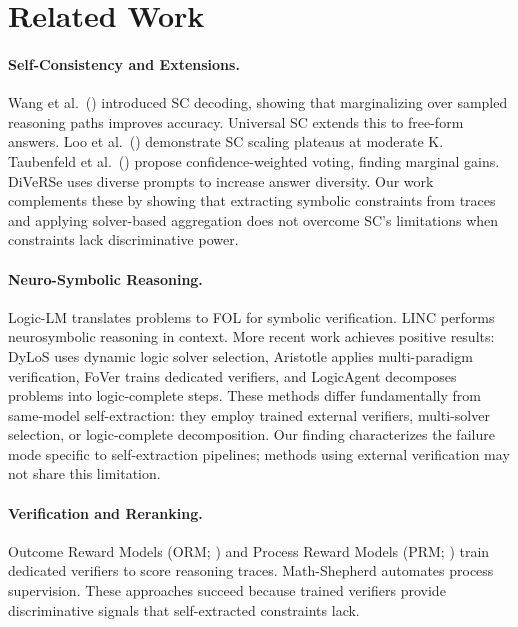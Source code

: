 \documentclass[11pt,a4paper]{article}
\begin{document}
\section{Related Work}

\paragraph{Self-Consistency and Extensions.}
Wang et al.\ (\citeyear{wang2023selfconsistency}) introduced SC decoding, showing that marginalizing over sampled reasoning paths improves accuracy. Universal SC \citep{chen2023usc} extends this to free-form answers. Loo et al.\ (\citeyear{loo2025scaling}) demonstrate SC scaling plateaus at moderate K. Taubenfeld et al.\ (\citeyear{taubenfeld2025weighted}) propose confidence-weighted voting, finding marginal gains. DiVeRSe \citep{li2023diverse} uses diverse prompts to increase answer diversity. Our work complements these by showing that extracting symbolic constraints from traces and applying solver-based aggregation does not overcome SC's limitations when constraints lack discriminative power.

\paragraph{Neuro-Symbolic Reasoning.}
Logic-LM \citep{pan2023logiclm} translates problems to FOL for symbolic verification. LINC \citep{olausson2023linc} performs neurosymbolic reasoning in context. More recent work achieves positive results: DyLoS uses dynamic logic solver selection, Aristotle applies multi-paradigm verification, FoVer trains dedicated verifiers, and LogicAgent decomposes problems into logic-complete steps. These methods differ fundamentally from same-model self-extraction: they employ trained external verifiers, multi-solver selection, or logic-complete decomposition. Our finding characterizes the failure mode specific to self-extraction pipelines; methods using external verification may not share this limitation.

\paragraph{Verification and Reranking.}
Outcome Reward Models (ORM; \citealt{cobbe2021gsm8k}) and Process Reward Models (PRM; \citealt{lightman2023prm}) train dedicated verifiers to score reasoning traces. Math-Shepherd \citep{wang2024mathshepherd} automates process supervision. These approaches succeed because trained verifiers provide discriminative signals that self-extracted constraints lack.
\end{document}
